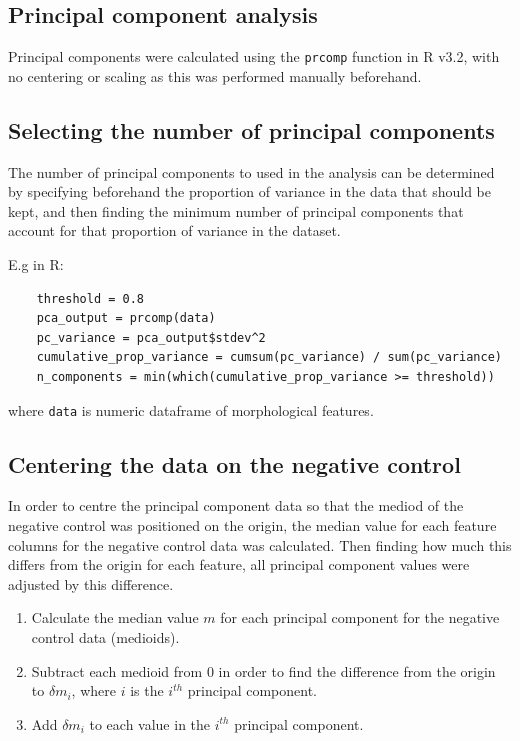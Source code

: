 \documentclass[a4paper,11pt,twoside,openright]{scrbook}
\begin{document}
\subsection{Principal component analysis}

Principal components were calculated using the \texttt{prcomp} function in R v3.2, with no centering or scaling as this was performed manually beforehand.

\subsection{Selecting the number of principal components}
The number of principal components to used in the analysis can be determined by specifying beforehand the proportion of variance in the data that should be kept, and then finding the minimum number of principal components that account for that proportion of variance in the dataset.

E.g in R:

\begin{verbatim}
    threshold = 0.8
    pca_output = prcomp(data)
    pc_variance = pca_output$stdev^2 
    cumulative_prop_variance = cumsum(pc_variance) / sum(pc_variance)
    n_components = min(which(cumulative_prop_variance >= threshold)) 
\end{verbatim}
where \texttt{data} is numeric dataframe of morphological features.


\subsection{Centering the data on the negative control}

In order to centre the principal component data so that the mediod of the negative control was positioned on the origin, the median value for each feature columns for the negative control data was calculated.
Then finding how much this differs from the origin for each feature, all principal component values were adjusted by this difference.

\begin{enumerate}
    \item Calculate the median value $m$ for each principal component for the negative control data (medioids).
    \item Subtract each medioid from 0 in order to find the difference from the origin to $\delta m_i$, where $i$ is the $i^{th}$ principal component.
    \item Add $\delta m_i$ to each value in the $i^{th}$ principal component.
\end{enumerate}
\end{document}
